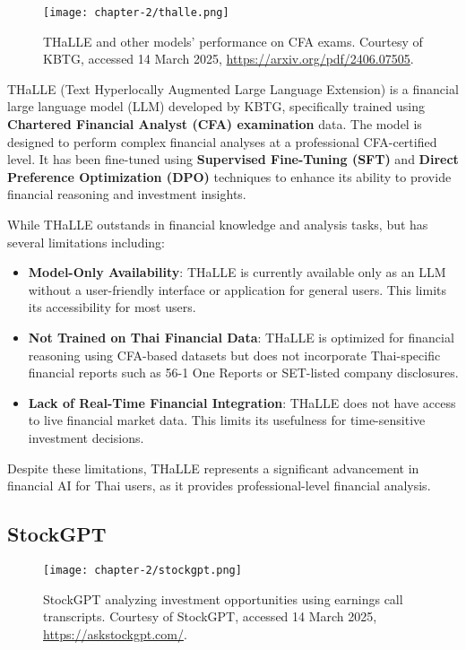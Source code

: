 \begin{figure}[h]
    \centering
    \texttt{[image: chapter-2/thalle.png]}
    \caption{THaLLE and other models' performance on CFA exams. Courtesy of KBTG, accessed 14 March 2025, \url{https://arxiv.org/pdf/2406.07505}.}
    \label{fig:thalle}
\end{figure}

\FloatBarrier

THaLLE (Text Hyperlocally Augmented Large Language Extension) is a financial large language model (LLM) developed by KBTG, specifically trained using \textbf{Chartered Financial Analyst (CFA) examination} data.
The model is designed to perform complex financial analyses at a professional CFA-certified level.
It has been fine-tuned using \textbf{Supervised Fine-Tuning (SFT)} and \textbf{Direct Preference Optimization (DPO)} techniques to enhance its ability to provide financial reasoning and investment insights.

While THaLLE outstands in financial knowledge and analysis tasks, but has several limitations including:

\begin{itemize}[leftmargin=60pt]
    \item \textbf{Model-Only Availability}: THaLLE is currently available only as an LLM without a user-friendly interface or application for general users. This limits its accessibility for most users.
    \item \textbf{Not Trained on Thai Financial Data}: THaLLE is optimized for financial reasoning using CFA-based datasets but does not incorporate Thai-specific financial reports such as 56-1 One Reports or SET-listed company disclosures.
    \item \textbf{Lack of Real-Time Financial Integration}: THaLLE does not have access to live financial market data. This limits its usefulness for time-sensitive investment decisions.
\end{itemize}

Despite these limitations, THaLLE represents a significant advancement in financial AI for Thai users, as it provides professional-level financial analysis\cite{THaLLEarXiv}.

\newpage

\subsection{StockGPT}
\label{subsection:stockgpt}

\begin{figure}[h]
    \centering
    \texttt{[image: chapter-2/stockgpt.png]}
    \caption{StockGPT analyzing investment opportunities using earnings call transcripts. Courtesy of StockGPT, accessed 14 March 2025, \url{https://askstockgpt.com/}.}
    \label{fig:stockgpt}
\end{figure}


